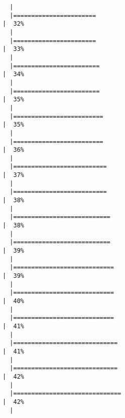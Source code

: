 \documentclass[
  letterpaper,
]{book}
\begin{document}
\begin{verbatim}
  |                                                                            
  |=======================                                               |  32%
  |                                                                            
  |=======================                                               |  33%
  |                                                                            
  |========================                                              |  34%
  |                                                                            
  |========================                                              |  35%
  |                                                                            
  |=========================                                             |  35%
  |                                                                            
  |=========================                                             |  36%
  |                                                                            
  |==========================                                            |  37%
  |                                                                            
  |==========================                                            |  38%
  |                                                                            
  |===========================                                           |  38%
  |                                                                            
  |===========================                                           |  39%
  |                                                                            
  |============================                                          |  39%
  |                                                                            
  |============================                                          |  40%
  |                                                                            
  |============================                                          |  41%
  |                                                                            
  |=============================                                         |  41%
  |                                                                            
  |=============================                                         |  42%
  |                                                                            
  |==============================                                        |  42%
  |                                                                            

\end{verbatim}
\end{document}
